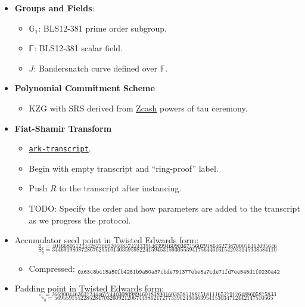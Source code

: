 \documentclass[
]{article}
\providecommand{\tightlist}{%
  \setlength{\itemsep}{0pt}\setlength{\parskip}{0pt}}
\begin{document}
\begin{itemize}
\item
  \textbf{Groups and Fields}:

  \begin{itemize}
  \tightlist
  \item
    \(\mathbb{G_1}\): BLS12-381 prime order subgroup.
  \item
    \(\mathbb{F}\): BLS12-381 scalar field.
  \item
    \(J\): Bandersnatch curve defined over \(\mathbb{F}\).
  \end{itemize}
\item
  \textbf{Polynomial Commitment Scheme}

  \begin{itemize}
  \tightlist
  \item
    KZG with SRS derived from
    \href{https://zfnd.org/conclusion-of-the-powers-of-tau-ceremony}{Zcash}
    powers of tau ceremony.
  \end{itemize}
\item
  \textbf{Fiat-Shamir Transform}

  \begin{itemize}
  \tightlist
  \item
    \href{https://crates.io/crates/ark-transcript}{\texttt{ark-transcript}}.
  \item
    Begin with empty transcript and ``ring-proof'' label.
  \item
    Push \(R\) to the transcript after instancing.
  \item
    TODO: Specify the order and how parameters are added to the
    transcript as we progress the protocol.
  \end{itemize}
\item
  Accumulator seed point in Twisted Edwards form:
  \[_{\text{S}_x = 40466805124442823009206085742433914639946090367156029186462738700056462095646}\]
  \[_{\text{S}_y = 34469198087286762951014035959822415945315930553941756446161542933145938584110}\]

  \begin{itemize}
  \tightlist
  \item
    Compressed:
    \(_{\texttt{0x63c8bc15a50fb4281b9a50a37cbde791377ebe5a7cde71fd7ee545d1f0230a42}}\)
  \end{itemize}
\item
  Padding point in Twisted Edwards form:
  \[_{\square_x = 26690044630372444677440308098946018389016038587388751811165279176488605875833}\]
  \[_{\square_y = 569559155228528470326092120674498621727733902430463954153034712442147510565}\]


\end{itemize}
\end{document}
